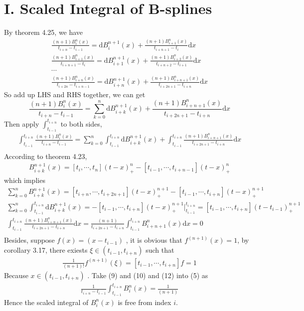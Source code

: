 \documentclass[twoside,a4paper]{article}
\newcommand{\dif}{\mathrm{d}}
\begin{document}
\pagestyle{fancy}
\fancyhead{}


\section*{I. Scaled Integral of B-splines}
By theorem 4.25, we have
\begin{gather}
\frac{(n+1)B_i^n(x)}{t_{i+n}-t_{i-1}}=\dif B_i^{n+1}(x) + \frac{(n+1)B_{i+1}^n(x)}{t_{i+n+1}-t_i}\dif x\\
\frac{(n+1)B_{i+1}^n(x)}{t_{i+n+1}-t_{i}}=\dif B_{i+1}^{n+1}(x) + \frac{(n+1)B_{i+2}^n(x)}{t_{i+n+2}-t_{i+1}}\dif x\\
\cdots\\
\frac{(n+1)B_{i+n}^n(x)}{t_{i+2n}-t_{i+n-1}}=\dif B_{i+n}^{n+1}(x) + \frac{(n+1)B_{i+n+1}^n(x)}{t_{i+2n+1}-t_{i+n}}\dif x
\end{gather}
So add up LHS and RHS together, we can get 
\[
\frac{(n+1)B_i^n(x)}{t_{i+n}-t_{i-1}}=\sum_{k=0}^n \dif B_{i+k}^{n+1}(x) + \frac{(n+1)B_{i+n+1}^n(x)}{t_{i+2n+1}-t_{i+n}} \dif x
\]
Then apply $\int_{t_{i-1}}^{t_{i+n}}$ to both sides, 
\begin{gather}
\int_{t_{i-1}}^{t_{i+n}}\frac{(n+1)B_i^n(x)}{t_{i+n}-t_{i-1}}=\sum_{k=0}^n \int_{t_{i-1}}^{t_{i+n}}\dif B_{i+k}^{n+1}(x) + \int_{t_{i-1}}^{t_{i+n}}\frac{(n+1)B_{i+n+1}^n(x)}{t_{i+2n+1}-t_{i+n}} \dif x\\
\end{gather}
According to theorem 4.23, 
\begin{gather}
B_{i+k}^{n+1}(x)=[t_{i},\cdots,t_n](t-x)_+^n-[t_{i-1},\cdots,t_{i+n-1}](t-x)^n_+
\end{gather}
which implies
\begin{gather}
\sum_{k=0}^n B_{i+k}^{n+1}(x)=[t_{i+n},\cdots,t_{i+2n+1}](t-x)_+^{n+1}-[t_{i-1},\cdots,t_{i+n}](t-x)_+^{n+1}\\
\sum_{k=0}^n \int_{t_{i-1}}^{t_{i+n}}\dif B_{i+k}^{n+1}(x)=-[t_{i-1},\cdots,t_{i+n}](t-x)_+^{n+1}|_{t_{i-1}}^{t_{i+n}}=[t_{i-1},\cdots,t_{i+n}](t-t_{i-1})_+^{n+1}\\
\int_{t_{i-1}}^{t_{i+n}}\frac{(n+1)B_{i+n+1}^n(x)}{t_{i+2n+1}-t_{i+n}} \dif x=\frac{(n+1)}{t_{i+2n+1}-t_{i+n}}\int_{t_{i-1}}^{t_{i+n}}B_{i+n+1}^n(x) \dif x=0 \\
\end{gather}
Besides, suppose $f(x)=(x-t_{i-1})$ , it is obvious that $f^{(n+1)}(x)=1$, by corollary 3.17, there exiests $\xi \in (t_{i-1},t_{i+n})$ such that
\begin{gather} 
\frac{1}{(n+1)!}f^{(n+1)}(\xi)=[t_{i-1},\cdots,t_{i+n}]f=1
\end{gather}
Because $x\in(t_{i-1},t_{i+n})$ . Take (9) and (10) and (12) into (5) as 
\begin{gather}
\frac{1}{t_{i+n}-t_{i-1}}\int_{t_{i-1}}^{t_{i+n}}B_i^n(x)=\frac{1}{(n+1)}
\end{gather}
Hence the scaled integral of $B_i^n(x)$ is free from index $i$.
\end{document}
